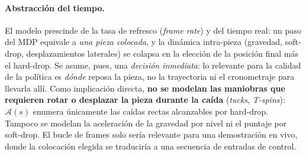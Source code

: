 \paragraph{Abstracción del tiempo.} El modelo prescinde de la tasa de refresco
(\emph{frame rate}) y del tiempo real: un paso del MDP equivale a \emph{una pieza
    colocada}, y la dinámica intra-pieza (gravedad, soft-drop, desplazamientos
laterales) se colapsa en la elección de la posición final más el hard-drop. Se
asume, pues, una \emph{decisión inmediata}: lo relevante para la calidad de la
política es \emph{dónde} reposa la pieza, no la trayectoria ni el cronometraje
para llevarla allí. Como implicación directa, \textbf{no se modelan las maniobras
    que requieren rotar o desplazar la pieza durante la caída} (\emph{tucks},
\emph{T-spins}): $\mathcal{A}(s)$ enumera únicamente las caídas rectas alcanzables
por hard-drop. Tampoco se modelan la aceleración de la gravedad por nivel ni el
puntaje por soft-drop. El bucle de frames solo sería relevante para una
demostración en vivo, donde la colocación elegida se traduciría a una secuencia
de entradas de control.

